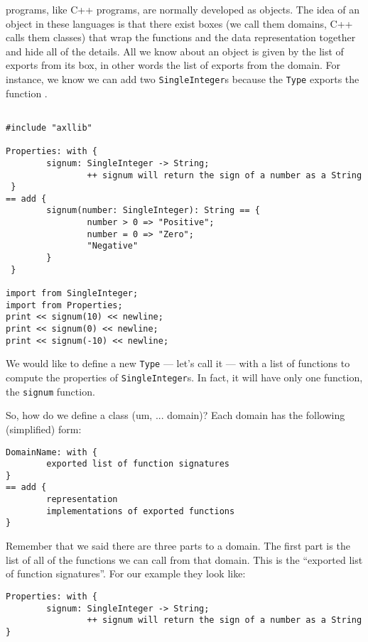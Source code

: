 \asharp{} programs, like C++ programs, are normally developed as objects.
The idea of an object in these languages is that there exist
boxes (we call them domains, C++ calls them classes) that wrap the
functions and the data representation together and hide all of the
details. All we know about an object is given by the list of exports
from its box, in other words the list of exports from the domain. 
For instance, we know we can add two {\tt SingleInteger}s
because the \verb"Type"  exports the function \ttin{+}.

\begin{small}
\begin{verbatim}

#include "axllib"

Properties: with {
        signum: SingleInteger -> String;
                ++ signum will return the sign of a number as a String
 }
== add {
        signum(number: SingleInteger): String == {
                number > 0 => "Positive";
                number = 0 => "Zero";
                "Negative"
        }
 }

import from SingleInteger;
import from Properties;
print << signum(10) << newline;
print << signum(0) << newline;
print << signum(-10) << newline;

\end{verbatim}
\end{small}

We would like to define a new \verb"Type" --- let's call it 
--- with a list of functions to compute the properties of
{\tt SingleInteger}s. In fact, it will have only one function, the 
\verb"signum" function. 

So, how do we define a class (um, ... domain)? Each domain has the following
(simplified) form:

\begin{small}%
\begin{verbatim}
DomainName: with {
        exported list of function signatures
}
== add {
        representation
        implementations of exported functions
}
\end{verbatim}
\end{small}

Remember that we said there are three
parts to a domain. The first part is the
list of all of the functions we can call from that domain. This is the
``exported list of function signatures''. For our example they look
like:

\begin{small}%
\begin{verbatim}
Properties: with {
        signum: SingleInteger -> String;
                ++ signum will return the sign of a number as a String
}
\end{verbatim}
\end{small}

